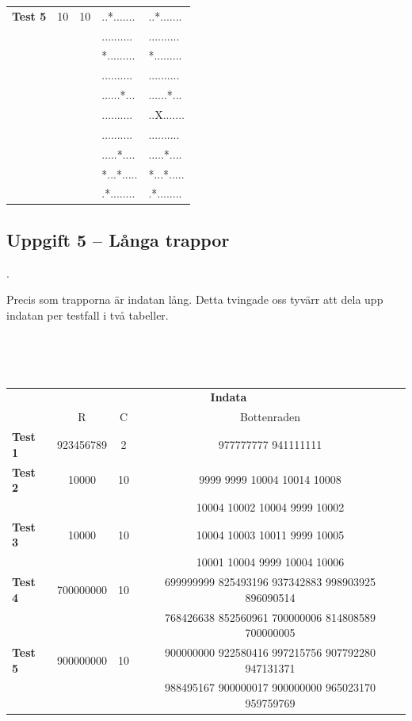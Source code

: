 \documentclass[a4paper,12pt,oneside]{amsbook}
\theoremstyle{test}
\newcommand{\fe}[1]{\textbf{#1}}            %
\begin{document}
{\begin{tabular}{||l||c|c|l||l||}
\hline
\fe{Test 5} &10&10&..*....... & ..*....... \\
&&&..........&..........\\
&&&*.........&*.........\\
&&&..........&..........\\
&&&......*...&......*...\\
&&&..........&..X.......\\
&&&..........&..........\\
&&&.....*....&.....*....\\
&&&*...*.....&*...*.....\\
&&&.*........&.*........\\
\hline\hline
\end{tabular}
}
\vspace{3cm}

\subsection*{Uppgift 5 -- Långa trappor} .

Precis som trapporna är indatan lång. Detta tvingade oss tyvärr
att dela upp indatan per testfall i två tabeller.

~\\
{\tt 
\begin{tabular}{||l||c|c|c||}\hline\hline
& \multicolumn{3}{c||}{\fe{Indata}} \\ 
& R & C & Bottenraden  \\ \hline \hline
\fe{Test 1} & 923456789 & 2 & 977777777 941111111\\ \hline
\fe{Test 2} & 10000 & 10 & 9999 9999 10004 10014 10008\\
&&& 10004 10002 10004 9999 10002 \\ \hline

\fe{Test 3} & 10000 & 10 & 10004 10003 10011 9999 10005\\
&&& 10001 10004 9999 10004 10006 \\ \hline

\fe{Test 4} & 700000000 & 10 & 699999999 825493196 937342883 998903925 896090514\\
&&& 768426638 852560961 700000006 814808589 700000005 \\ \hline

\fe{Test 5} & 900000000 & 10 & 900000000 922580416 997215756 907792280 947131371\\
&&& 988495167 900000017 900000000 965023170 959759769 \\ \hline

\hline\hline
\end{tabular}
}
\end{document}
